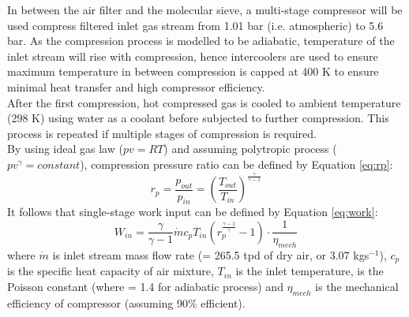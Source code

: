         In between the air filter and the molecular sieve, a multi-stage compressor will be used compress filtered inlet gas stream from 1.01 bar (i.e. atmospheric) to 5.6 bar. As the compression process is modelled to be adiabatic, temperature of the inlet stream will rise with compression, hence intercoolers are used to ensure maximum temperature in between compression is capped at 400 K to ensure minimal heat transfer and high compressor efficiency. \\
        After the first compression, hot compressed gas is cooled to ambient temperature (298 K) using water as a coolant before subjected to further compression. This process is repeated if multiple stages of compression is required.\\
        By using ideal gas law ($pv=RT$) and assuming polytropic process ($pv^\gamma=constant$), compression pressure ratio can be defined by Equation \ref{eq:rp}:
        \begin{equation}
            r_p = \frac{p_{out}}{p_{in}} = \left(\frac{T_{out}}{T_{in}}\right)^\frac{\gamma}{\gamma-1}
            \label{eq:rp}
        \end{equation}
        It follows that single-stage work input can be defined by Equation \ref{eq:work}:
        \begin{equation}
            W_{in}=\frac{\gamma}{\gamma-1}\dot{m}c_pT_{in}\left(r_p^{\frac{\gamma-1}{\gamma}}-1\right)\cdot\frac{1}{\eta_{mech}}
            \label{eq:work}
        \end{equation}
        where $\dot{m}$ is inlet stream mass flow rate (= 265.5 tpd of dry air, or 3.07 kgs$^{-1}$), $c_p$ is the specific heat capacity of air mixture, $T_{in}$ is the inlet temperature, {\textgamma} is the Poisson constant (where {\textgamma} = 1.4 for adiabatic process) and ${\eta}_{mech}$ is the mechanical efficiency of compressor (assuming 90\% efficient).\\
        

